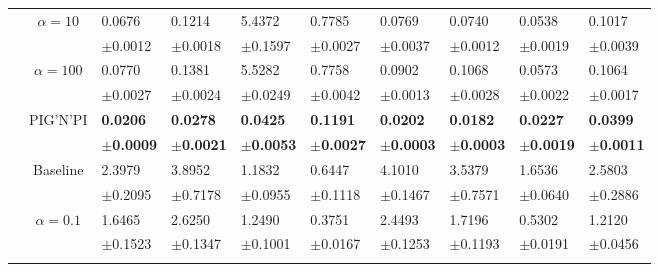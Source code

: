 \documentclass{article}
\newcommand{\pignpi}{PIG'N'PI\xspace}
\begin{document}
\begin{table}[h!]
{\begin{tabularx}{\textwidth}{ccX X X X X X X X}
        \cline{3-10}\rule{0pt}{2.3ex}
        & \multirow{2}{*}{$\alpha=10$}
        & 0.0676 & 0.1214 & 5.4372 & 0.7785 & 0.0769 & 0.0740 & 0.0538 & 0.1017\\
        &&\scriptsize$\pm$0.0012 & \scriptsize $\pm$0.0018 & \scriptsize $\pm$0.1597 & \scriptsize $\pm$0.0027 & \scriptsize $\pm$0.0037 & \scriptsize $\pm$0.0012 & \scriptsize $\pm$0.0019 & \scriptsize $\pm$0.0039\\

        \cline{3-10}\rule{0pt}{2.3ex}
        & \multirow{2}{*}{$\alpha=100$}
        & 0.0770 & 0.1381 & 5.5282 & 0.7758 & 0.0902 & 0.1068 & 0.0573 & 0.1064\\
        &&\scriptsize$\pm$0.0027 & \scriptsize $\pm$0.0024 & \scriptsize $\pm$0.0249 & \scriptsize $\pm$0.0042 & \scriptsize $\pm$0.0013 & \scriptsize $\pm$0.0028 & \scriptsize $\pm$0.0022 & \scriptsize $\pm$0.0017\\
        \cline{3-10}\rule{0pt}{2.3ex}
        
        &\multirow{2}{*}{\pignpi}
        &\textbf{0.0206} & \textbf{0.0278} & \textbf{0.0425} & \textbf{0.1191} & \textbf{0.0202} & \textbf{0.0182} & \textbf{0.0227} & \textbf{0.0399}\\
        &&\scriptsize\textbf{$\pm$0.0009} & \scriptsize \textbf{$\pm$0.0021} & \scriptsize \textbf{$\pm$0.0053} & \scriptsize \textbf{$\pm$0.0027} & \scriptsize \textbf{$\pm$0.0003} & \scriptsize \textbf{$\pm$0.0003} & \scriptsize \textbf{$\pm$0.0019} & \scriptsize \textbf{$\pm$0.0011}\\
        \hline\rule{0pt}{2.3ex}
    
        \multirow{12}{*}{  \textsf{MAE\textsubscript{ef}}}

        &\multirow{2}{*}{Baseline}
        &2.3979 & 3.8952 & 1.1832 & 0.6447 & 4.1010 & 3.5379 & 1.6536 & 2.5803\\
        &&\scriptsize$\pm$0.2095 & \scriptsize $\pm$0.7178 & \scriptsize $\pm$0.0955 & \scriptsize $\pm$0.1118 & \scriptsize $\pm$0.1467 & \scriptsize $\pm$0.7571 & \scriptsize $\pm$0.0640 & \scriptsize $\pm$0.2886\\
        \cline{3-10}\rule{0pt}{2.3ex}
        
        & \multirow{2}{*}{$\alpha=0.1$}
        & 1.6465 & 2.6250 & 1.2490 & 0.3751 & 2.4493 & 1.7196 & 0.5302 & 1.2120\\
        &&\scriptsize$\pm$0.1523 & \scriptsize $\pm$0.1347 & \scriptsize $\pm$0.1001 & \scriptsize $\pm$0.0167 & \scriptsize $\pm$0.1253 & \scriptsize $\pm$0.1193 & \scriptsize $\pm$0.0191 & \scriptsize $\pm$0.0456\\
        \cline{3-10}\rule{0pt}{2.3ex}
        

\end{tabularx}}
\end{table}
\end{document}
